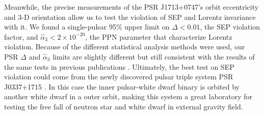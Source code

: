 
Meanwhile, the precise measurements of the PSR J1713+0747's orbit eccentricity and
3-D orientation allow us to test the violation of SEP and 
Lorentz invariance with it. We found a single-pulsar 95\% upper limit on 
$\Delta <0.01$, the SEP violation factor, and
$\hat{\alpha}_3<2\times10^{-20}$, the PPN parameter that characterize Lorentz
violation. 
Because of the different statistical analysis methods were used, our PSR
$\Delta$ and $\hat{\alpha}_3$ limits  are slightly
different but still consistent with the results of the same tests in previous publications 
\citep{wex00, sns+05, sfl+05, gsf+11}.
Ultimately, the best test on SEP violation could come from the newly
discovered pulsar triple system PSR J0337+1715 \citep{rsa+14}. In this case 
the inner pulsar-white dwarf binary is orbited by another white dwarf in a
outer orbit, making this system a great laboratory for testing
the free fall of neutron star and white dwarf in external gravity field.



